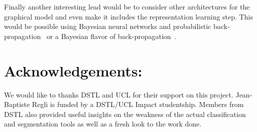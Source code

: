 \documentclass[a4paper,11pt]{report}
\begin{document}
		Finally another interesting lead would be to consider other architectures for the graphical model and even make it includes the representation learning step. This would be possible using Bayesian neural networks and probabilistic back-propagation~\citep{hernandez2015probabilistic} or a Bayesian flavor of back-propagation~\citep{blundell2015weight}.
    
\chapter{Acknowledgements:}
	We would like to thanks DSTL and UCL for their support on this project. Jean-Baptiste Regli is funded by a DSTL/UCL Impact studentship. Members from DSTL also provided useful insights on the weakness of the actual classification and segmentation tools as well as a fresh look to the work done.\\

	
\renewcommand\bibname{Bibliography:}

\nocite{*}
\end{document}
